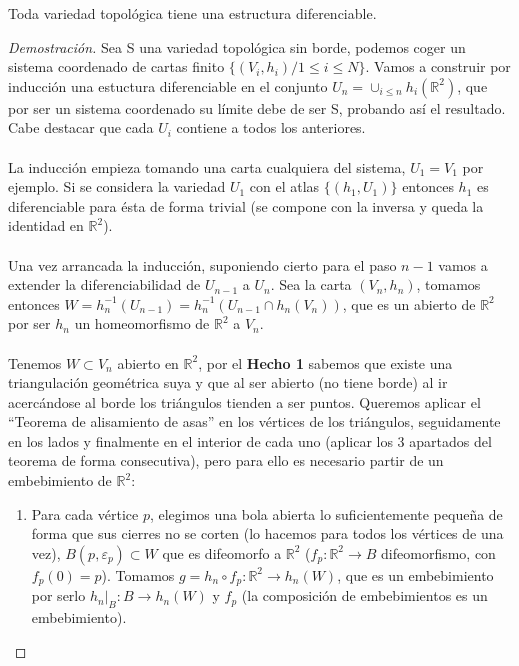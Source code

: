 	\begin{teora}
		Toda variedad topológica tiene una estructura diferenciable.
	\end{teora}
	\begin{proof}[Demostración]
		Sea S una variedad topológica sin borde, podemos coger un sistema coordenado de cartas finito $\{(V_i, h_i)/ 1\leq i\leq N\}$. Vamos a construir por inducción una estuctura diferenciable en el conjunto $U_n = \cup_{i\leq n}h_i(\mathbb{R}^2)$, que por ser un sistema coordenado su límite debe de ser S, probando así el resultado. Cabe destacar que cada $U_i$ contiene a todos los anteriores. \\
		\\ La inducción empieza tomando una carta cualquiera del sistema, $U_1=V_1$ por ejemplo. Si se considera la variedad $U_1$ con el atlas $\{(h_1,U_1)\}$ entonces $h_1$ es diferenciable para ésta de forma trivial (se compone con la inversa y queda la identidad en $\mathbb{R}^2$).\\
		\\ Una vez arrancada la inducción, suponiendo cierto para el paso $n-1$ vamos a extender la diferenciabilidad de $U_{n-1}$ a $U_n$. Sea la carta $(V_n, h_n)$, tomamos entonces $W=h_n^{-1}(U_{n-1})=h_n^{-1}(U_{n-1}\cap h_n(V_n))$, que es un abierto de $\mathbb{R}^2$ por ser $h_n$ un homeomorfismo de $\mathbb{R}^2$ a $V_n$. \\
		\\ Tenemos $W\subset V_n$ abierto en $\mathbb{R}^2$, por el \textbf{Hecho 1} sabemos que existe una triangulación geométrica suya y que al ser abierto (no tiene borde) al ir acercándose al borde los triángulos tienden a ser puntos. Queremos aplicar el ``Teorema de alisamiento de asas'' en los vértices de los triángulos, seguidamente en los lados y finalmente en el interior de cada uno (aplicar los 3 apartados del teorema de forma consecutiva), pero para ello es necesario partir de un embebimiento de $\mathbb{R}^2$:
		\begin{enumerate}
			\item Para cada vértice $p$, elegimos una bola abierta lo suficientemente pequeña de forma que sus cierres no se corten (lo hacemos para todos los vértices de una vez), $B(p,\varepsilon _p)\subset W$ que es difeomorfo a $\mathbb{R}^2$ ($f_p:\mathbb{R}^2\rightarrow B$ difeomorfismo, con $f_p(0)=p$). Tomamos $g=h_n\circ f_p:\mathbb{R}^2\rightarrow h_n(W)$, que es un embebimiento por serlo $h_n|_B:B\rightarrow h_n(W)$ y $f_p$ (la composición de embebimientos es un embebimiento). \\

\end{enumerate}
\end{proof}

